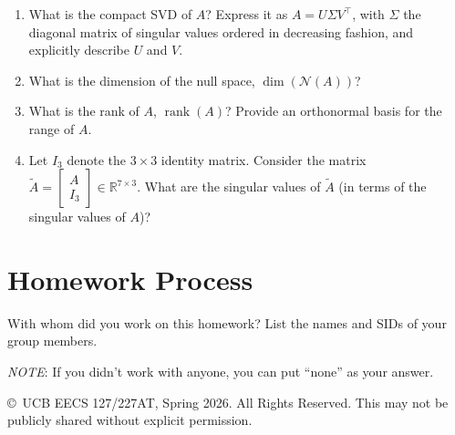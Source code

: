 \documentclass[10pt]{article}
\theoremstyle{definition}
\theoremstyle{plain}
\newcommand{\RR}{\mathbb{R}}
\newcommand{\NN}{\mathcal{N}}
\DeclareMathOperator{\rank}{rank}
\begin{document}
\begin{enumerate}[label=(\alph*)]
\item What is the compact SVD of $A$? Express it as $A = U\Sigma V^\top$, with $\Sigma$ the diagonal matrix of singular values ordered in decreasing fashion, and explicitly describe $U$ and $V$.

\item What is the dimension of the null space, $\dim(\NN(A))$?

\item What is the rank of $A$, $\rank(A)$? Provide an orthonormal basis for the range of $A$.

\item Let $I_3$ denote the $3 \times 3$ identity matrix. Consider the matrix $\tilde{A} = \begin{bmatrix} A \\ I_3 \end{bmatrix} \in \RR^{7 \times 3}$. What are the singular values of $\tilde{A}$ (in terms of the singular values of $A$)?
\end{enumerate}

\section{Homework Process}

With whom did you work on this homework? List the names and SIDs of your group members.

\textit{NOTE}: If you didn't work with anyone, you can put ``none'' as your answer.

\vfill
\begin{center}
\small \copyright\ UCB EECS 127/227AT, Spring 2026. All Rights Reserved. This may not be publicly shared without explicit permission.
\end{center}
\end{document}
